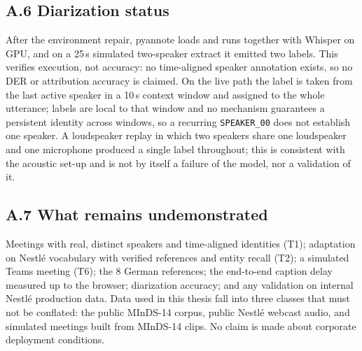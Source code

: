\subsection*{A.6 Diarization status}
After the environment repair, pyannote loads and runs together with Whisper on GPU, and on a 25\,s simulated
two-speaker extract it emitted two labels. This verifies execution, not accuracy: no time-aligned speaker
annotation exists, so no DER or attribution accuracy is claimed. On the live path the label is taken from the last
active speaker in a 10\,s context window and assigned to the whole utterance; labels are local to that window and
no mechanism guarantees a persistent identity across windows, so a recurring \texttt{SPEAKER\_00} does not
establish one speaker. A loudspeaker replay in which two speakers share one loudspeaker and one microphone
produced a single label throughout; this is consistent with the acoustic set-up and is not by itself a failure of
the model, nor a validation of it.

\subsection*{A.7 What remains undemonstrated}
Meetings with real, distinct speakers and time-aligned identities (T1); adaptation on Nestlé vocabulary with
verified references and entity recall (T2); a simulated Teams meeting (T6); the 8 German references; the
end-to-end caption delay measured up to the browser; diarization accuracy; and any validation on internal
Nestlé production data. Data used in this thesis fall into three classes that must not be conflated: the public
MInDS-14 corpus, public Nestlé webcast audio, and simulated meetings built from MInDS-14 clips. No claim is made
about corporate deployment conditions.
